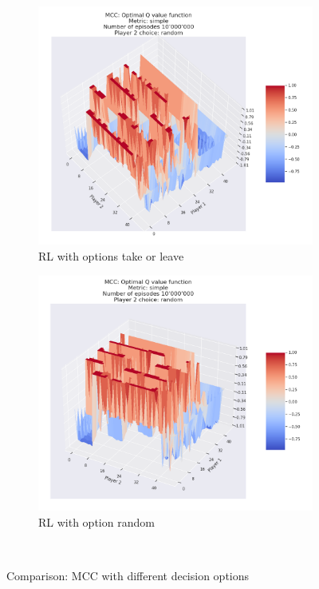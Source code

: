   
\begin{figure}[ht!]
    \begin{subfigure}{0.5\textwidth}
        \includegraphics[width=1\linewidth]{Figures/mcc_simple_10000000_random} 
        \caption[RL with options take or leave]{RL with options take or leave}
        \label{fig:RL with options take or leave}
    \end{subfigure}
    \begin{subfigure}{0.5\textwidth}
        \includegraphics[width=1\linewidth]{Figures/mcc_simple_10000000_random_2}
        \caption[RL with option random]{RL with option random}
        \label{fig:RL with option random}
    \end{subfigure} \\
    \caption{Comparison: MCC with different decision options}
\label{fig:Comparison: MCC with different decision options}
\end{figure}
